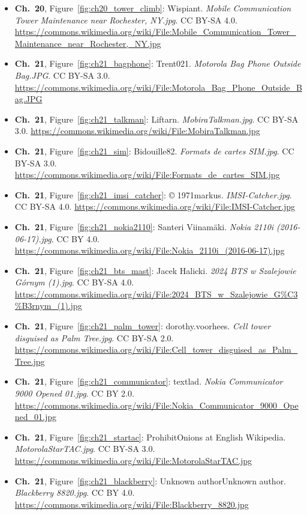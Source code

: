 \begin{small}
\begin{itemize}[leftmargin=0pt,itemsep=2pt,label={}]
\item \textbf{Ch.~20}, Figure~\ref{fig:ch20_tower_climb}: Wispiant. \emph{Mobile Communication Tower Maintenance near Rochester, NY.\allowbreak{}jpg}. CC BY-SA 4.0. \url{https://commons.wikimedia.org/wiki/File:Mobile_Communication_Tower_Maintenance_near_Rochester,_NY.jpg}
\item \textbf{Ch.~21}, Figure~\ref{fig:ch21_bagphone}: Trent021. \emph{Motorola Bag Phone Outside Bag.\allowbreak{}JPG}. CC BY-SA 3.0. \url{https://commons.wikimedia.org/wiki/File:Motorola_Bag_Phone_Outside_Bag.JPG}
\item \textbf{Ch.~21}, Figure~\ref{fig:ch21_talkman}: Liftarn. \emph{MobiraTalkman.\allowbreak{}jpg}. CC BY-SA 3.0. \url{https://commons.wikimedia.org/wiki/File:MobiraTalkman.jpg}
\item \textbf{Ch.~21}, Figure~\ref{fig:ch21_sim}: Bidouille82. \emph{Formats de cartes SIM.\allowbreak{}jpg}. CC BY-SA 3.0. \url{https://commons.wikimedia.org/wiki/File:Formats_de_cartes_SIM.jpg}
\item \textbf{Ch.~21}, Figure~\ref{fig:ch21_imsi_catcher}: © 1971markus. \emph{IMSI-\allowbreak{}Catcher.\allowbreak{}jpg}. CC BY-SA 4.0. \url{https://commons.wikimedia.org/wiki/File:IMSI-Catcher.jpg}
\item \textbf{Ch.~21}, Figure~\ref{fig:ch21_nokia2110}: Santeri Viinamäki. \emph{Nokia 2110i (2016-\allowbreak{}06-\allowbreak{}17).\allowbreak{}jpg}. CC BY 4.0. \url{https://commons.wikimedia.org/wiki/File:Nokia_2110i_(2016-06-17).jpg}
\item \textbf{Ch.~21}, Figure~\ref{fig:ch21_bts_mast}: Jacek Halicki. \emph{2024 BTS w Szalejowie Górnym (1).\allowbreak{}jpg}. CC BY-SA 4.0. \url{https://commons.wikimedia.org/wiki/File:2024_BTS_w_Szalejowie_G%C3%B3rnym_(1).jpg}
\item \textbf{Ch.~21}, Figure~\ref{fig:ch21_palm_tower}: dorothy.voorhees. \emph{Cell tower disguised as Palm Tree.\allowbreak{}jpg}. CC BY-SA 2.0. \url{https://commons.wikimedia.org/wiki/File:Cell_tower_disguised_as_Palm_Tree.jpg}
\item \textbf{Ch.~21}, Figure~\ref{fig:ch21_communicator}: textlad. \emph{Nokia Communicator 9000 Opened 01.\allowbreak{}jpg}. CC BY 2.0. \url{https://commons.wikimedia.org/wiki/File:Nokia_Communicator_9000_Opened_01.jpg}
\item \textbf{Ch.~21}, Figure~\ref{fig:ch21_startac}: ProhibitOnions at English Wikipedia. \emph{MotorolaStarTAC.\allowbreak{}jpg}. CC BY-SA 3.0. \url{https://commons.wikimedia.org/wiki/File:MotorolaStarTAC.jpg}
\item \textbf{Ch.~21}, Figure~\ref{fig:ch21_blackberry}: Unknown authorUnknown author. \emph{Blackberry 8820.\allowbreak{}jpg}. CC BY 4.0. \url{https://commons.wikimedia.org/wiki/File:Blackberry_8820.jpg}

\end{itemize}
\end{small}

